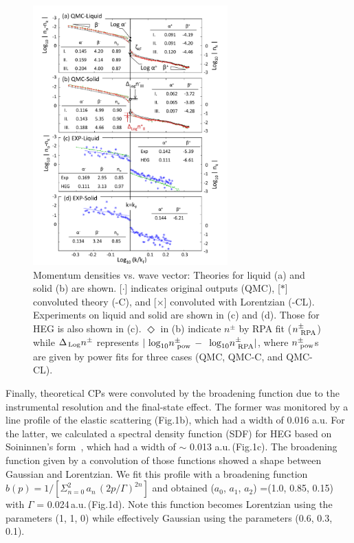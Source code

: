 \documentclass[twocolumn,showpacs,showkeys,fleqn,prl,superscriptaddress]{revtex4}%
\newcommand{\nn}[1]{\textnormal{ #1}}
\begin{document}
\begin{figure}
\includegraphics[bb= 70 10 500 700, width=7.5cm]{fig3.pdf}
\caption{Momentum densities vs. wave vector:  Theories for liquid (a) and solid (b) are shown. [$\cdot$] indicates original outputs (QMC), [$*$]  convoluted theory (-C), and [$\times$] convoluted with Lorentzian (-CL).  Experiments on liquid and solid are shown in (c) and (d). Those for HEG is also shown in (c).
 $\Diamond$ in (b) indicate $n^{\pm}$ by RPA fit ($n^{\pm}_{\nn{RPA}}$)  
while $\Delta_{\!\nn{Log}} n^{\pm}$ represents $ | \nn{log}_{10} n^{\pm}_{\nn{pow}} \,-\, \nn{log}_{10} n^{\pm}_{\nn{RPA}} | $,
where $ n^{\pm}_{\nn{pow}} $s are given by power fits for three cases (QMC, QMC-C, and QMC-CL).
} 
\label{Fig.3}
\end{figure}

Finally, theoretical CPs were convoluted by the broadening function due to the instrumental resolution and the final-state effect.
The former was monitored by a line profile of the elastic scattering (Fig.1b), which had a width of 0.016 a.u.
For the latter, we calculated a spectral density function (SDF) for HEG based on Soininnen's form~\cite{soi01}, which had a width of $\sim$ 0.013 a.u.\,(Fig.1c).
The broadening function given by a convolution of those functions showed a shape between Gaussian and Lorentzian.
We fit this profile with a broadening function $b(p) =1/ [ \Sigma_{n=0}^{2}\,a_n\,(2p / \Gamma )^{2n} ]$ and obtained ($a_0$, $a_1$, $a_2$) =(1.0, 0.85, 0.15) with $\Gamma$ = 0.024\,a.u.\,(Fig.1d).
Note this function becomes Lorentzian using the parameters (1, 1, 0) while effectively Gaussian using the parameters (0.6, 0.3, 0.1).
\end{document}
